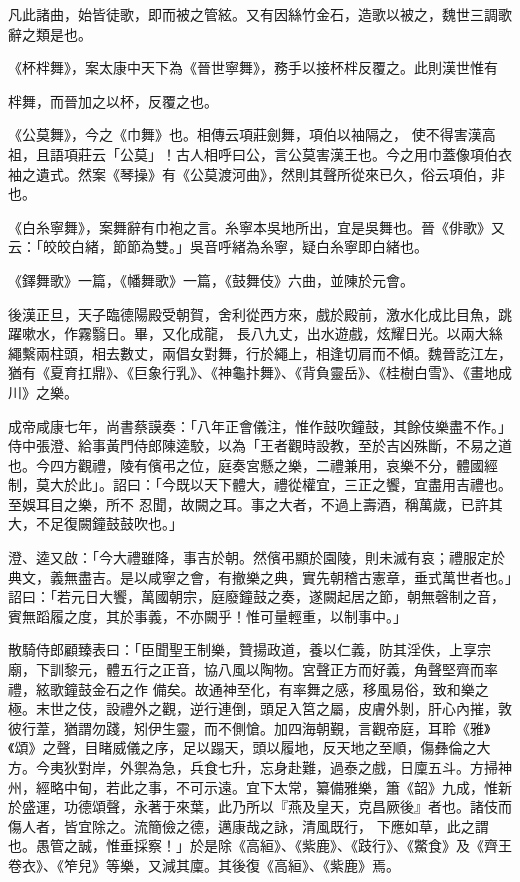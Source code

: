 \begin{pinyinscope}
 凡此諸曲，始皆徒歌，即而被之管絃。又有因絲竹金石，造歌以被之，魏世三調歌辭之類是也。



 《杯柈舞》，案太康中天下為《晉世寧舞》，務手以接杯柈反覆之。此則漢世惟有



 柈舞，而晉加之以杯，反覆之也。



 《公莫舞》，今之《巾舞》也。相傳云項莊劍舞，項伯以袖隔之，
 使不得害漢高祖，且語項莊云「公莫」！古人相呼曰公，言公莫害漢王也。今之用巾蓋像項伯衣袖之遺式。然案《琴操》有《公莫渡河曲》，然則其聲所從來已久，俗云項伯，非也。



 《白糸寧舞》，案舞辭有巾袍之言。糸寧本吳地所出，宜是吳舞也。晉《俳歌》又云：「皎皎白緒，節節為雙。」吳音呼緒為糸寧，疑白糸寧即白緒也。



 《鐸舞歌》一篇，《幡舞歌》一篇，《鼓舞伎》六曲，並陳於元會。



 後漢正旦，天子臨德陽殿受朝賀，舍利從西方來，戲於殿前，激水化成比目魚，跳躍嗽水，作霧翳日。畢，又化成龍，
 長八九丈，出水遊戲，炫耀日光。以兩大絲繩繫兩柱頭，相去數丈，兩倡女對舞，行於繩上，相逢切肩而不傾。魏晉訖江左，猶有《夏育扛鼎》、《巨象行乳》、《神龜抃舞》、《背負靈岳》、《桂樹白雪》、《畫地成川》之樂。



 成帝咸康七年，尚書蔡謨奏：「八年正會儀注，惟作鼓吹鐘鼓，其餘伎樂盡不作。」侍中張澄、給事黃門侍郎陳逵駮，以為「王者觀時設教，至於吉凶殊斷，不易之道也。今四方觀禮，陵有儐弔之位，庭奏宮懸之樂，二禮兼用，哀樂不分，體國經制，莫大於此」。詔曰：「今既以天下體大，禮從權宜，三正之饗，宜盡用吉禮也。至娛耳目之樂，所不
 忍聞，故闕之耳。事之大者，不過上壽酒，稱萬歲，已許其大，不足復闕鐘鼓鼓吹也。」



 澄、逵又啟：「今大禮雖降，事吉於朝。然儐弔顯於園陵，則未滅有哀；禮服定於典文，義無盡吉。是以咸寧之會，有撤樂之典，實先朝稽古憲章，垂式萬世者也。」詔曰：「若元日大饗，萬國朝宗，庭廢鐘鼓之奏，遂闕起居之節，朝無磬制之音，賓無蹈履之度，其於事義，不亦闕乎！惟可量輕重，以制事中。」



 散騎侍郎顧臻表曰：「臣聞聖王制樂，贊揚政道，養以仁義，防其淫佚，上享宗廟，下訓黎元，體五行之正音，協八風以陶物。宮聲正方而好義，角聲堅齊而率禮，絃歌鐘鼓金石之作
 備矣。故通神至化，有率舞之感，移風易俗，致和樂之極。末世之伎，設禮外之觀，逆行連倒，頭足入筥之屬，皮膚外剝，肝心內摧，敦彼行葦，猶謂勿踐，矧伊生靈，而不側愴。加四海朝覲，言觀帝庭，耳聆《雅》《頌》之聲，目睹威儀之序，足以蹋天，頭以履地，反天地之至順，傷彝倫之大方。今夷狄對岸，外禦為急，兵食七升，忘身赴難，過泰之戲，日廩五斗。方掃神州，經略中甸，若此之事，不可示遠。宜下太常，纂備雅樂，簫《韶》九成，惟新於盛運，功德頌聲，永著于來葉，此乃所以『燕及皇天，克昌厥後』者也。諸伎而傷人者，皆宜除之。流簡儉之德，邁康哉之詠，清風既行，
 下應如草，此之謂也。愚管之誠，惟垂採察！」於是除《高絙》、《紫鹿》、《跂行》、《鱉食》及《齊王卷衣》、《笮兒》等樂，又減其廩。其後復《高絙》、《紫鹿》焉。



\end{pinyinscope}